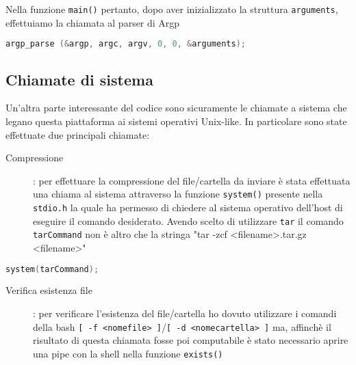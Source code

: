 \documentclass[11pt,fleqn]{book} %
\begin{document}
\noindent Nella funzione \texttt{main()} pertanto, dopo aver inizializzato la struttura \texttt{arguments}, effettuiamo la chiamata al parser di Argp

\begin{lstlisting}[language=C]
argp_parse (&argp, argc, argv, 0, 0, &arguments);
\end{lstlisting}


\subsection{Chiamate di sistema}
Un'altra parte interessante del codice sono sicuramente le chiamate a sistema che legano questa piattaforma ai sistemi operativi Unix-like.
In particolare sono state effettuate due principali chiamate:
\begin{description}
	\item[Compressione]: per effettuare la compressione del file/cartella da inviare è stata effettuata una chiama al sistema attraverso la funzione 			\texttt{system()} presente nella \texttt{stdio.h} la quale ha permesso di chiedere al sistema operativo dell'host di eseguire il comando 				desiderato. Avendo scelto di utilizzare \texttt{tar} il comando \texttt{tarCommand} non è altro che la stringa "tar -zcf <filename>.tar.gz 			<filename>"
\end{description}

\begin{lstlisting}[language=C]
	system(tarCommand);
\end{lstlisting}

\begin{description}
		
	\item[Verifica esistenza file]: per verificare l'esistenza del file/cartella ho dovuto utilizzare i comandi della bash \texttt{[ -f <nomefile> 			]}/\texttt{[ -d <nomecartella> ]} ma, affinchè il risultato di questa chiamata fosse poi computabile è stato necessario aprire una pipe con la 			shell nella funzione \texttt{exists()}		
\end{description}
\end{document}
